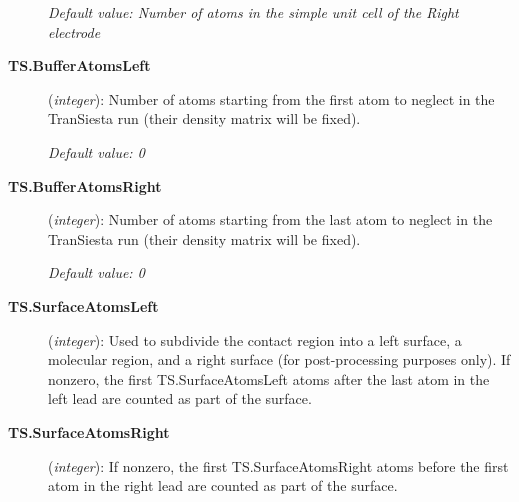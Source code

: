 \documentclass[11pt]{article}
\begin{document}
\begin{description}
{\it Default value: Number of atoms in the simple unit cell of the Right electrode} 

\item[{\bf TS.BufferAtomsLeft}] ({\it integer}): 
Number of atoms starting from the first atom to neglect in the  
{\sc TranSiesta} run (their density matrix will be fixed).

{\it Default value: 0} 

\item[{\bf TS.BufferAtomsRight}] ({\it integer}): 
Number of atoms starting from the last atom to neglect in the  
{\sc TranSiesta} run (their density matrix will be fixed).

{\it Default value: 0} 

\item[{\bf TS.SurfaceAtomsLeft}] ({\it integer}): 
Used to subdivide the contact region into a left surface, a molecular region, 
and a right surface (for post-processing purposes only). If nonzero, the first 
TS.SurfaceAtomsLeft atoms after the last atom in the left lead are counted 
as part of the surface.

\item[{\bf TS.SurfaceAtomsRight}] ({\it integer}): 
If nonzero, the first TS.SurfaceAtomsRight atoms before the first atom in the right 
lead are counted as part of the surface.

\end{description}
\end{document}
